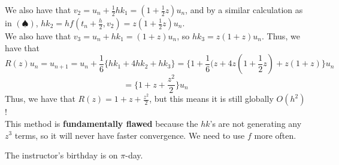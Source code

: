 \documentclass{article}
\begin{document}
    We also have that $v_2 = u_n + \frac{1}{2} h k_1 = (1 + \frac{1}{2} z) u_n$, and by a similar calculation as in $(\spadesuit)$, $h k_2 = h f(t_n + \frac{h}{2}, v_2) = z (1 + \frac{1}{2} z) u_n$.\\

    We also have that $v_3 = u_n + h k_1 = (1 + z) u_n$, so $h k_3 = z (1 + z) u_n$. Thus, we have that
    \[R(z) u_n = u_{n+1} = u_n + \frac{1}{6} \{h k_1 + 4 h k_2 + h k_3\} = \{1 + \frac{1}{6} (z + 4z (1 + \frac{1}{2} z) + z(1+z) \} u_n\]
    \[= \{1 + z + \frac{z^2}{2}\} u_n\]
    Thus, we have that $R(z) = 1 + z + \frac{z^2}{2}$, but this means it is still globally $O(h^2)$!\\

    This method is \textbf{fundamentally flawed} because the $hk$'s are not generating any $z^3$ terms, so it will never have faster convergence. We need to use $f$ more often.
\begin{remark}
    The instructor's birthday is on $\pi$-day.
\end{remark}
\end{document}

